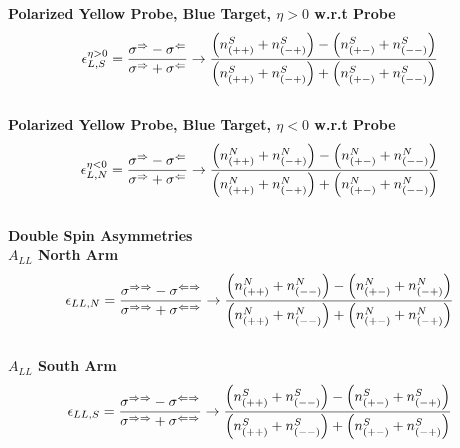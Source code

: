 \noindent\textbf{Polarized Yellow Probe, Blue Target, $\eta > 0$ w.r.t Probe}
\begin{equation}
  {\epsilon_{L,S}^{\eta > 0}} 
  = 
  { 
    {\sigma^\Rightarrow - \sigma^\Leftarrow} 
    \over 
    {\sigma^\Rightarrow + \sigma^\Leftarrow} 
  } 
  \to 
  {
    {\left(n_{(++)}^S+n_{(-+)}^S\right)-\left(n_{(+-)}^S+n_{(--)}^S\right)}
    \over
    {\left(n_{(++)}^S+n_{(-+)}^S\right)+\left(n_{(+-)}^S+n_{(--)}^S\right)}
  }
  \label{eq:al_yell_probe_pos_rap}
\end{equation}\\

\noindent\textbf{Polarized Yellow Probe, Blue Target, $\eta < 0$ w.r.t Probe}
\begin{equation}
  {\epsilon_{L,N}^{\eta < 0}} 
  = 
  { 
    {\sigma^\Rightarrow - \sigma^\Leftarrow} 
    \over 
    {\sigma^\Rightarrow + \sigma^\Leftarrow} 
  } 
  \to 
  {
    {\left(n_{(++)}^N+n_{(-+)}^N\right)-\left(n_{(+-)}^N+n_{(--)}^N\right)}
    \over
    {\left(n_{(++)}^N+n_{(-+)}^N\right)+\left(n_{(+-)}^N+n_{(--)}^N\right)}
  }
  \label{eq:al_yell_probe_neg_rap}
\end{equation}\\

\noindent\textbf{Double Spin Asymmetries} \\

\noindent\textbf{$A_{LL}$ North Arm}
\begin{equation}
  {\epsilon_{LL,N}}
  = 
  { 
    {\sigma^{\Rightarrow\Rightarrow} - \sigma^{\Leftarrow\Rightarrow}} 
    \over 
    {\sigma^{\Rightarrow\Rightarrow} + \sigma^{\Leftarrow\Rightarrow}} 
  } 
  \to 
  {
    {\left(n_{(++)}^N+n_{(--)}^N\right)-\left(n_{(+-)}^N+n_{(-+)}^N\right)}
    \over
    {\left(n_{(++)}^N+n_{(--)}^N\right)+\left(n_{(+-)}^N+n_{(-+)}^N\right)}
  }
  \label{eq:all_north}
\end{equation}\\

\noindent\textbf{$A_{LL}$ South Arm}
\begin{equation}
  {\epsilon_{LL,S}}
  = 
  { 
    {\sigma^{\Rightarrow\Rightarrow} - \sigma^{\Leftarrow\Rightarrow}} 
    \over 
    {\sigma^{\Rightarrow\Rightarrow} + \sigma^{\Leftarrow\Rightarrow}} 
  } 
  \to 
  {
    {\left(n_{(++)}^S+n_{(--)}^S\right)-\left(n_{(+-)}^S+n_{(-+)}^S\right)}
    \over
    {\left(n_{(++)}^S+n_{(--)}^S\right)+\left(n_{(+-)}^S+n_{(-+)}^S\right)}
  }
  \label{eq:all_south}
\end{equation}\\

